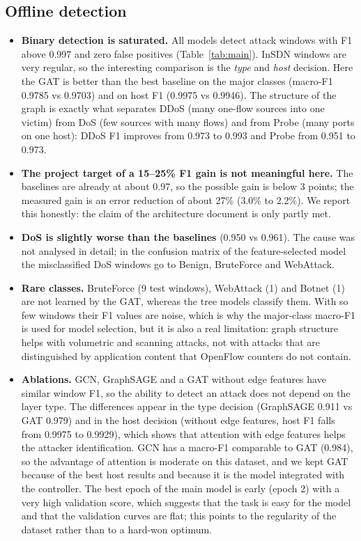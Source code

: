 \subsection{Offline detection}
\begin{itemize}
	\item \textbf{Binary detection is saturated.} All models detect attack windows with F1 above 0.997 and zero false positives (Table~\ref{tab:main}). InSDN windows are very regular, so the interesting comparison is the \emph{type} and \emph{host} decision. Here the GAT is better than the best baseline on the major classes (macro-F1 0.9785 vs 0.9703) and on host F1 (0.9975 vs 0.9946). The structure of the graph is exactly what separates DDoS (many one-flow sources into one victim) from DoS (few sources with many flows) and from Probe (many ports on one host): DDoS F1 improves from 0.973 to 0.993 and Probe from 0.951 to 0.973.
	\item \textbf{The project target of a 15--25\% F1 gain is not meaningful here.} The baselines are already at about 0.97, so the possible gain is below 3 points; the measured gain is an error reduction of about 27\% (3.0\% to 2.2\%). We report this honestly: the claim of the architecture document is only partly met.
	\item \textbf{DoS is slightly worse than the baselines} (0.950 vs 0.961). The cause was not analysed in detail; in the confusion matrix of the feature-selected model the misclassified DoS windows go to Benign, BruteForce and WebAttack.
	\item \textbf{Rare classes.} BruteForce (9 test windows), WebAttack (1) and Botnet (1) are not learned by the GAT, whereas the tree models classify them. With so few windows their F1 values are noise, which is why the major-class macro-F1 is used for model selection, but it is also a real limitation: graph structure helps with volumetric and scanning attacks, not with attacks that are distinguished by application content that OpenFlow counters do not contain.
	\item \textbf{Ablations.} GCN, GraphSAGE and a GAT without edge features have similar window F1, so the ability to detect an attack does not depend on the layer type. The differences appear in the type decision (GraphSAGE 0.911 vs GAT 0.979) and in the host decision (without edge features, host F1 falls from 0.9975 to 0.9929), which shows that attention with edge features helps the attacker identification. GCN has a macro-F1 comparable to GAT (0.984), so the advantage of attention is moderate on this dataset, and we kept GAT because of the best host results and because it is the model integrated with the controller. The best epoch of the main model is early (epoch 2) with a very high validation score, which suggests that the task is easy for the model and that the validation curves are flat; this points to the regularity of the dataset rather than to a hard-won optimum.

\end{itemize}
